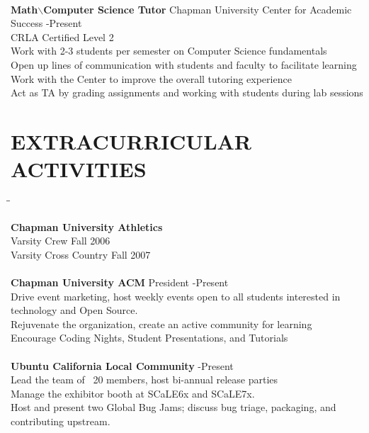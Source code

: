 \documentclass{res}
\begin{document}
\begin{resume}
\begin{tabbing}
\\

   {\bf Math$\backslash$Computer Science Tutor}  \>Chapman University Center for Academic Success -Present\\
	 CRLA Certified Level 2\\
	 Work with 2-3 students per semester on Computer Science fundamentals\\
	 Open up lines of communication with students and faculty to facilitate learning\\
	 Work with the Center to improve the overall tutoring experience\\
	 Act as TA by grading assignments and working with students during lab sessions\\
	\end{tabbing}
 
   \vspace{-0.3in}	
\section{EXTRACURRICULAR ACTIVITIES}          
	\vspace{-5pt}
   \begin{tabbing}
   \hspace{2.5in}\= \hspace{3.45in}\= \kill %

    {\bf Chapman University Athletics}\\
	Varsity Crew \> \>\hspace{0.2in}Fall 2006\\
	Varsity Cross Country \> \>\hspace{0.2in}Fall 2007\\

\\

    {\bf Chapman University ACM} \> \hspace{0.9in}President -Present\\
	 Drive event marketing, host weekly events open to all students interested in technology and Open Source.\\
	 Rejuvenate the organization, create an active community for learning \\
	 Encourage Coding Nights, Student Presentations, and Tutorials\\

\\

    {\bf Ubuntu California Local Community} \> -Present\\
	Lead the team of ~20 members, host bi-annual release parties \\
	Manage the exhibitor booth at SCaLE6x and SCaLE7x. \\
	Host and present two Global Bug Jams; discuss bug triage, packaging, and contributing upstream. \\


\end{tabbing}
\end{resume}
\end{document}
